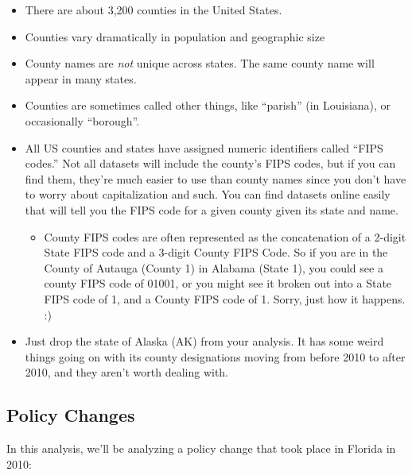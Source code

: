 \documentclass[12pt]{article}
\begin{document}
\begin{itemize}
  \item There are about 3,200 counties in the United States.
  \item Counties vary dramatically in population and geographic size
  \item County names are \emph{not} unique across states. The same county name will appear in many states.
  \item Counties are sometimes called other things, like ``parish'' (in Louisiana), or occasionally ``borough''.
  \item All US counties and states have assigned numeric identifiers called ``FIPS codes.'' Not all datasets will include the county's FIPS codes, but if you can find them, they're much easier to use than county names since you don't have to worry about capitalization and such. You can find datasets online easily that will tell you the FIPS code for a given county given its state and name.
  \begin{itemize}
    \item County FIPS codes are often represented as the concatenation of a 2-digit State FIPS code and a 3-digit County FIPS Code. So if you are in the County of Autauga (County 1) in Alabama (State 1), you could see a county FIPS code of 01001, or you might see it broken out into a State FIPS code of 1, and a County FIPS code of 1. Sorry, just how it happens. :)
  \end{itemize}
  \item Just drop the state of Alaska (AK) from your analysis. It has some weird things going on with its county designations moving from before 2010 to after 2010, and they aren't worth dealing with.
\end{itemize}

\subsection*{Policy Changes}

In this analysis, we'll be analyzing a policy change that took place in Florida in 2010:
\end{document}
